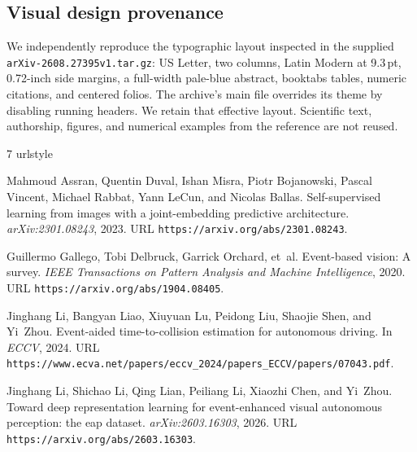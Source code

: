 \documentclass[twocolumn,letterpaper]{article}
\begin{document}
\subsection{Visual design provenance}
We independently reproduce the typographic layout inspected in the supplied \texttt{arXiv-2608.27395v1.tar.gz}: US Letter, two columns, Latin Modern at 9.3\,pt, 0.72-inch side margins, a full-width pale-blue abstract, booktabs tables, numeric citations, and centered folios. The archive's main file overrides its theme by disabling running headers. We retain that effective layout. Scientific text, authorship, figures, and numerical examples from the reference are not reused.

\newpage

\begin{thebibliography}{7}
\providecommand{\natexlab}[1]{#1}
\providecommand{\url}[1]{\texttt{#1}}
\expandafter\ifx\csname urlstyle\endcsname\relax
  \providecommand{\doi}[1]{doi: #1}\else
  \providecommand{\doi}{doi: \begingroup \urlstyle{rm}\Url}\fi

Mahmoud Assran, Quentin Duval, Ishan Misra, Piotr Bojanowski, Pascal Vincent,
  Michael Rabbat, Yann LeCun, and Nicolas Ballas.
\newblock Self-supervised learning from images with a joint-embedding
  predictive architecture.
\newblock \emph{arXiv:2301.08243}, 2023.
\newblock URL \url{https://arxiv.org/abs/2301.08243}.

Guillermo Gallego, Tobi Delbruck, Garrick Orchard, et~al.
\newblock Event-based vision: A survey.
\newblock \emph{IEEE Transactions on Pattern Analysis and Machine
  Intelligence}, 2020.
\newblock URL \url{https://arxiv.org/abs/1904.08405}.

Jinghang Li, Bangyan Liao, Xiuyuan Lu, Peidong Liu, Shaojie Shen, and Yi~Zhou.
\newblock Event-aided time-to-collision estimation for autonomous driving.
\newblock In \emph{ECCV}, 2024.
\newblock URL
  \url{https://www.ecva.net/papers/eccv_2024/papers_ECCV/papers/07043.pdf}.

Jinghang Li, Shichao Li, Qing Lian, Peiliang Li, Xiaozhi Chen, and Yi~Zhou.
\newblock Toward deep representation learning for event-enhanced visual
  autonomous perception: the eap dataset.
\newblock \emph{arXiv:2603.16303}, 2026.
\newblock URL \url{https://arxiv.org/abs/2603.16303}.


\end{thebibliography}
\end{document}

